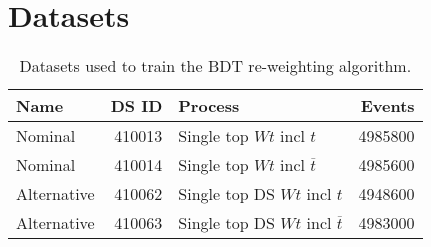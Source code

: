 \chapter{Datasets}%
\label{app:datasets}
\begin{table}[ht]
  \centering
  \begin{tabular}{lrlr}
    \toprule
    {\bfseries Name} & {\bfseries DS ID} & {\bfseries Process} & {\bfseries Events} \\ 
    \midrule
    Nominal     & 410013 & Single top $Wt$ incl $t$               & 4985800 \\
    Nominal     & 410014 & Single top $Wt$ incl $\overline{t}$    & 4985600 \\
    Alternative & 410062 & Single top DS $Wt$ incl $t$            & 4948600 \\
    Alternative & 410063 & Single top DS $Wt$ incl $\overline{t}$ & 4983000 \\
    \bottomrule
  \end{tabular}
  \caption{Datasets used to train the BDT re-weighting algorithm.}%
  \label{tab:data}
\end{table}
